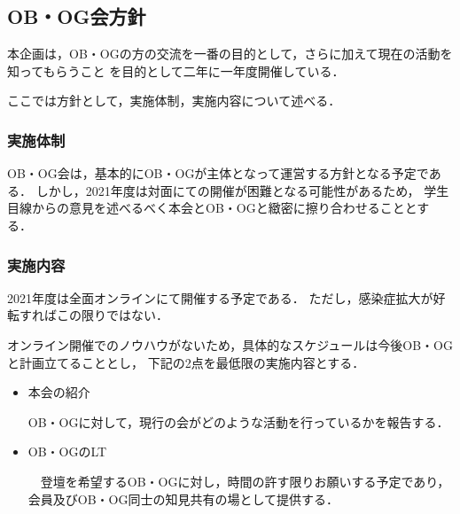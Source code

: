 \subsection*{OB・OG会方針}


本企画は，OB・OGの方の交流を一番の目的として，さらに加えて現在の活動を知ってもらうこと
を目的として二年に一年度開催している．

ここでは方針として，実施体制，実施内容について述べる．

\subsubsection*{実施体制}

OB・OG会は，基本的にOB・OGが主体となって運営する方針となる予定である．
しかし，2021年度は対面にての開催が困難となる可能性があるため，
学生目線からの意見を述べるべく本会とOB・OGと緻密に擦り合わせることとする．

\subsubsection*{実施内容}

2021年度は全面オンラインにて開催する予定である．
ただし，感染症拡大が好転すればこの限りではない．

オンライン開催でのノウハウがないため，具体的なスケジュールは今後OB・OGと計画立てることとし，
下記の2点を最低限の実施内容とする．

\begin{itemize}
    \item 本会の紹介

        OB・OGに対して，現行の会がどのような活動を行っているかを報告する．
    \item OB・OGのLT

        　登壇を希望するOB・OGに対し，時間の許す限りお願いする予定であり，会員及びOB・OG同士の知見共有の場として提供する．
\end{itemize}


